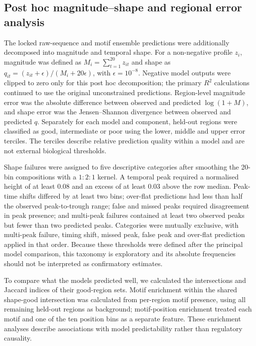 \documentclass[a4paper,12pt]{article}
\begin{document}
\subsection{Post hoc magnitude--shape and regional error analysis}

The locked raw-sequence and motif ensemble predictions were additionally decomposed into magnitude and temporal shape. For a non-negative profile $z_i$, magnitude was defined as $M_i=\sum_{t=1}^{20}z_{it}$ and shape as $q_{it}=(z_{it}+\epsilon)/(M_i+20\epsilon)$, with $\epsilon=10^{-8}$. Negative model outputs were clipped to zero only for this post hoc decomposition; the primary $R^2$ calculations continued to use the original unconstrained predictions. Region-level magnitude error was the absolute difference between observed and predicted $\log(1+M)$, and shape error was the Jensen--Shannon divergence between observed and predicted $q$. Separately for each model and component, held-out regions were classified as good, intermediate or poor using the lower, middle and upper error terciles. The terciles describe relative prediction quality within a model and are not external biological thresholds.

Shape failures were assigned to five descriptive categories after smoothing the 20-bin compositions with a $1{:}2{:}1$ kernel. A temporal peak required a normalised height of at least 0.08 and an excess of at least 0.03 above the row median. Peak-time shifts differed by at least two bins; over-flat predictions had less than half the observed peak-to-trough range; false and missed peaks required disagreement in peak presence; and multi-peak failures contained at least two observed peaks but fewer than two predicted peaks. Categories were mutually exclusive, with multi-peak failure, timing shift, missed peak, false peak and over-flat prediction applied in that order. Because these thresholds were defined after the principal model comparison, this taxonomy is exploratory and its absolute frequencies should not be interpreted as confirmatory estimates.

To compare what the models predicted well, we calculated the intersections and Jaccard indices of their good-region sets. Motif enrichment within the shared shape-good intersection was calculated from per-region motif presence, using all remaining held-out regions as background; motif-position enrichment treated each motif and one of the ten position bins as a separate feature. These enrichment analyses describe associations with model predictability rather than regulatory causality.
\end{document}
